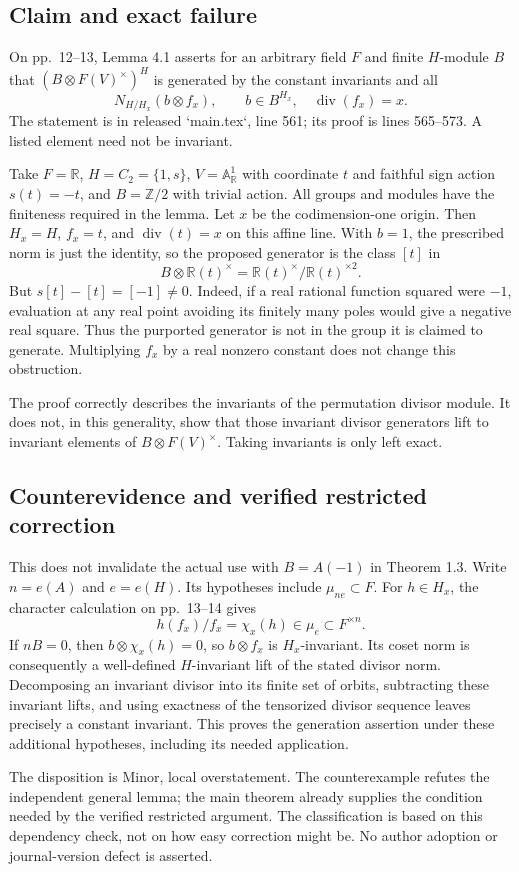 \documentclass[10pt]{article}
\begin{document}
\subsection*{Claim and exact failure}
On pp. 12–13, Lemma 4.1 asserts for an arbitrary field \(F\) and finite \(H\)-module \(B\) that \((B\otimes F(V)^\times)^H\) is generated by the constant invariants and all \[N_{H/H_x}(b\otimes f_x),\qquad b\in B^{H_x},\quad \operatorname{div}(f_x)=x .\] The statement is in released `main.tex`, line 561; its proof is lines 565–573. A listed element need not be invariant.\par
Take \(F=\mathbb R\), \(H=C_2=\{1,s\}\), \(V=\mathbb A^1_\mathbb R\) with coordinate \(t\) and faithful sign action \(s(t)=-t\), and \(B=\mathbb Z/2\) with trivial action. All groups and modules have the finiteness required in the lemma. Let \(x\) be the codimension-one origin. Then \(H_x=H\), \(f_x=t\), and \(\operatorname{div}(t)=x\) on this affine line. With \(b=1\), the prescribed norm is just the identity, so the proposed generator is the class \([t]\) in \[B\otimes \mathbb R(t)^\times=\mathbb R(t)^\times/\mathbb R(t)^{\times2}.\] But \(s[t]-[t]=[-1]\ne0\). Indeed, if a real rational function squared were \(-1\), evaluation at any real point avoiding its finitely many poles would give a negative real square. Thus the purported generator is not in the group it is claimed to generate. Multiplying \(f_x\) by a real nonzero constant does not change this obstruction.\par
The proof correctly describes the invariants of the permutation divisor module. It does not, in this generality, show that those invariant divisor generators lift to invariant elements of \(B\otimes F(V)^\times\). Taking invariants is only left exact.\par
\subsection*{Counterevidence and verified restricted correction}
This does not invalidate the actual use with \(B=A(-1)\) in Theorem 1.3. Write \(n=e(A)\) and \(e=e(H)\). Its hypotheses include \(\mu_{ne}\subset F\). For \(h\in H_x\), the character calculation on pp. 13–14 gives \[h(f_x)/f_x=\chi_x(h)\in\mu_e\subset F^{\times n}.\] If \(nB=0\), then \(b\otimes\chi_x(h)=0\), so \(b\otimes f_x\) is \(H_x\)-invariant. Its coset norm is consequently a well-defined \(H\)-invariant lift of the stated divisor norm. Decomposing an invariant divisor into its finite set of orbits, subtracting these invariant lifts, and using exactness of the tensorized divisor sequence leaves precisely a constant invariant. This proves the generation assertion under these additional hypotheses, including its needed application.\par
The disposition is Minor, local overstatement. The counterexample refutes the independent general lemma; the main theorem already supplies the condition needed by the verified restricted argument. The classification is based on this dependency check, not on how easy correction might be. No author adoption or journal-version defect is asserted.\par
\end{document}

